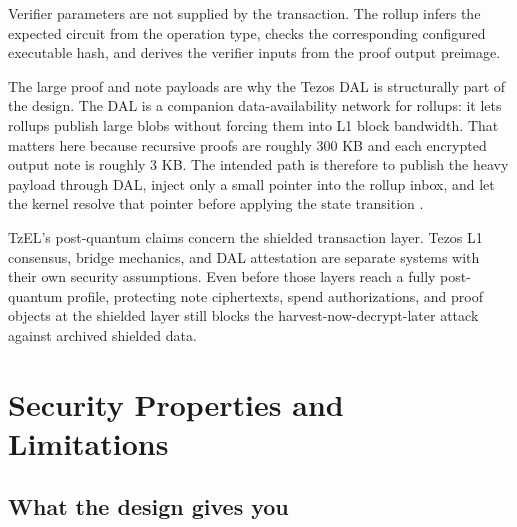 \documentclass[11pt]{article}
\newcommand{\TzEL}{TzEL}
\begin{document}
Verifier parameters are not supplied by the transaction. The rollup infers the
expected circuit from the operation type, checks the corresponding configured
executable hash, and derives the verifier inputs from the proof output
preimage.

The large proof and note payloads are why the Tezos DAL is structurally part of
the design. The DAL is a companion data-availability network for rollups: it
lets rollups publish large blobs without forcing them into L1 block bandwidth.
That matters here because recursive proofs are roughly 300 KB and each encrypted
output note is roughly 3 KB. The intended path is therefore to publish the
heavy payload through DAL, inject only a small pointer into the rollup inbox,
and let the kernel resolve that pointer before applying the state transition
\cite{tezos-smart-rollups,tezos-dal}.

\TzEL{}'s post-quantum claims concern the shielded transaction layer. Tezos L1
consensus, bridge mechanics, and DAL attestation are separate systems with
their own security assumptions. Even before those layers reach a fully
post-quantum profile, protecting note ciphertexts, spend authorizations, and
proof objects at the shielded layer still blocks the harvest-now-decrypt-later
attack against archived shielded data.

\section{Security Properties and Limitations}

\subsection{What the design gives you}
\end{document}
